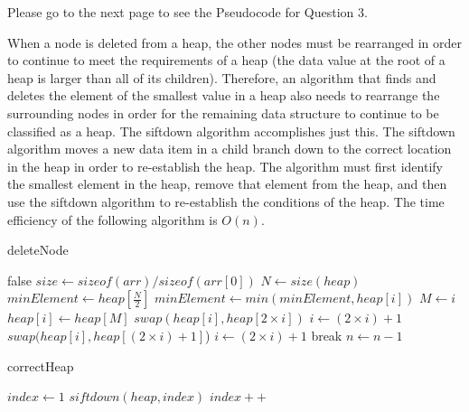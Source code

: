 \documentclass{article}
\begin{document}
Please go to the next page to see the Pseudocode for Question 3.

When a node is deleted from a heap, the other nodes must be rearranged in order to continue to meet the requirements of a heap (the data value at the root of a heap is larger than all of its children). Therefore, an algorithm that finds and deletes the element of the smallest value in a heap also needs to rearrange the surrounding nodes in order for the remaining data structure to continue to be classified as a heap. The siftdown algorithm accomplishes just this. The siftdown algorithm moves a new data item in a child branch down to the correct location in the heap in order to re-establish the heap. The algorithm must first identify the smallest element in the heap, remove that element from the heap, and then use the siftdown algorithm to re-establish the conditions of the heap. The time efficiency of the following algorithm is $O(n)$.

\begin{algorithm}[H]
\caption{deleteNode}\label{alg:cap}
\begin{algorithmic}
\State \Return false
\Else
\State $size \gets sizeof(arr) / sizeof(arr[0])$
\State $N \gets size(heap)$
\State $minElement \gets heap[\frac{N}{2}]$
\State $minElement \gets min(minElement, heap[i])$
\EndFor
{}
\State $M \gets i$
\State $heap[i] \gets heap[M]$
\EndIf
\EndFor
{}
\State $swap(heap[i], heap[2 \times i])$
\State $i \gets (2 \times i)+1$
\State $swap(heap[i], heap[(2 \times i)+1]$)
\State $i \gets (2 \times i)+1$
\Else
\State break
\EndIf
\EndFor
\State $n \gets n-1$
\EndIf
\end{algorithmic}
\end{algorithm}

\begin{algorithm}[H]
\caption{correctHeap}\label{alg:cap}
\begin{algorithmic}
\State $index \gets 1$
\State $siftdown(heap, index)$
\State $index++$
\EndWhile
\end{algorithmic}
\end{algorithm}
\end{document}
